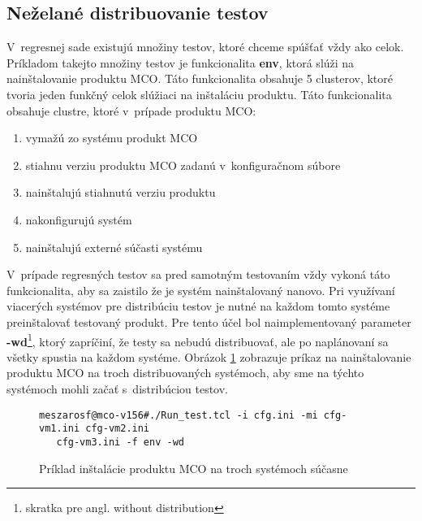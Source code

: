 \subsection*{Neželané distribuovanie testov}
V~regresnej sade existujú množiny testov, ktoré chceme spúšťať vždy ako celok.
Príkladom takejto množiny testov je funkcionalita \textbf{env}, ktorá
slúži na nainštalovanie produktu MCO. Táto funkcionalita obsahuje 5 clusterov,
ktoré tvoria jeden funkčný celok slúžiaci na inštaláciu produktu.
Táto funkcionalita obsahuje clustre, ktoré v~prípade produktu MCO:
\begin{enumerate}
\item vymažú zo systému produkt MCO
\item stiahnu verziu produktu MCO zadanú v~konfiguračnom súbore
\item nainštalujú stiahnutú verziu produktu
\item nakonfigurujú systém
\item nainštalujú externé súčasti systému
\end{enumerate} 

V~prípade regresných testov sa pred samotným testovaním vždy vykoná táto 
funkcionalita, aby sa zaistilo že je systém nainštalovaný nanovo.
Pri využívaní viacerých systémov pre distribúciu testov je nutné na každom
tomto systéme preinštalovať testovaný produkt. Pre tento účel bol naimplementovaný
parameter \textbf{-wd}\footnote{skratka pre angl. without distribution}, ktorý zapríčiní,
že testy sa nebudú distribuovať, ale po naplánovaní sa všetky spustia na 
každom systéme. Obrázok \ref{obrazok:distribuovana_instalacia} zobrazuje 
príkaz na nainštalovanie produktu MCO na troch distribuovaných systémoch,
aby sme na týchto systémoch mohli začať s~distribúciou testov.


\begin{figure}[h]
\begin{lstlisting}
meszarosf@mco-v156#./Run_test.tcl -i cfg.ini -mi cfg-vm1.ini cfg-vm2.ini 
   cfg-vm3.ini -f env -wd
\end{lstlisting}
\caption{Príklad inštalácie produktu MCO na troch systémoch súčasne}
\label{obrazok:distribuovana_instalacia}
\end{figure}

%
%
